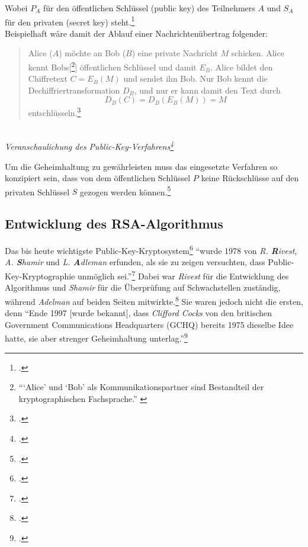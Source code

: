\documentclass{scrarticle} %
\begin{document}
        Wobei $P_A$ für den öffentlichen Schlüssel (public key) des Teilnehmers $A$ und $S_A$ für den privaten (secret key) steht.\footcite[Vgl.][21f.]{ertel2003}\\
        Beispielhaft wäre damit der Ablauf einer Nachrichtenübertrag folgender:
        \begin{quote}
            Alice ($A$) möchte an Bob ($B$) eine private Nachricht $M$ schicken. Alice kennt Bobs[\footnote{\enquote{\enquote*{Alice} und \enquote*{Bob} als Kommunikationspartner sind Bestandteil der kryptographischen Fachsprache.} \cite[21]{ertel2003}}] öffentlichen Schlüssel und damit $E_B$. Alice bildet den Chiffretext $C = E_B(M)$ und sendet ihn Bob. Nur Bob kennt die Dechiffriertransformation $D_B$, und nur er kann damit den Text durch
            \begin{equation*}
                D_B(C) = D_B(E_B(M)) = M
            \end{equation*}
            entschlüsseln.\footcite[68]{watjen2008}
        \end{quote}
        \begin{center}
            \\ %
            \emph{Veranschaulichung des Public-Key-Verfahrens\footcite[67]{watjen2008}}\\            
        \end{center}
        Um die Geheimhaltung zu gewährleisten muss das eingesetzte Verfahren so konzipiert sein, dass von dem öffentlichen Schlüssel $P$ keine Rückschlüsse auf den privaten Schlüssel $S$ gezogen werden können.\footcite[49]{beutelspacher2015} %
    
    \subsection{Entwicklung des RSA-Algorithmus}
        Das bis heute wichtigste Public-Key-Kryptosystem\footcite[Vgl.][26]{pieprzyk2010topics} \enquote{wurde 1978 von \emph{R. \textbf{R}ivest},\\ \emph{A. \textbf{S}hamir} und \emph{L. \textbf{A}dleman} erfunden, als sie zu zeigen versuchten, dass Public-Key-Kryptographie unmöglich sei.}\footcite[77]{beutelspacher2015} Dabei war \emph{Rivest} für die Entwicklung des Algorithmus und \emph{Shamir} für die Überprüfung auf Schwachstellen zuständig, während \emph{Adelman} auf beiden Seiten mitwirkte.\footcite[77]{ertel2003} Sie waren jedoch nicht die ersten, denn \enquote{Ende 1997 [wurde bekannt], dass \emph{Clifford Cocks} von den britischen Government Communications Headquarters (GCHQ) bereits 1975 dieselbe Idee hatte, sie aber strenger Geheimhaltung unterlag.}\footcite[71]{watjen2008}%
    
\end{document}

